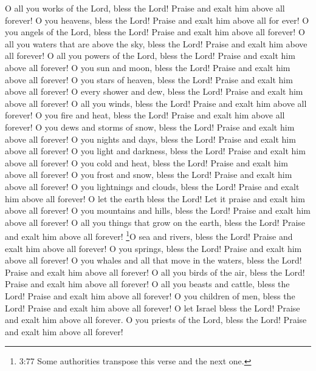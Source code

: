  O all you works of the Lord, bless the Lord! Praise and
exalt him above all forever!  O you heavens, bless the
Lord! Praise and exalt him above all for ever!  O you
angels of the Lord, bless the Lord! Praise and exalt him above all
forever!  O all you waters that are above the sky, bless
the Lord! Praise and exalt him above all forever!  O all
you powers of the Lord, bless the Lord! Praise and exalt him above all
forever!  O you sun and moon, bless the Lord! Praise and
exalt him above all forever!  O you stars of heaven, bless
the Lord! Praise and exalt him above all forever!  O every
shower and dew, bless the Lord! Praise and exalt him above all forever!
 O all you winds, bless the Lord! Praise and exalt him
above all forever!  O you fire and heat, bless the Lord!
Praise and exalt him above all forever!  O you dews and
storms of snow, bless the Lord! Praise and exalt him above all forever!
 O you nights and days, bless the Lord! Praise and exalt
him above all forever!  O you light and darkness, bless the
Lord! Praise and exalt him above all forever!  O you cold
and heat, bless the Lord! Praise and exalt him above all forever!
 O you frost and snow, bless the Lord! Praise and exalt him
above all forever!  O you lightnings and clouds, bless the
Lord! Praise and exalt him above all forever!  O let the
earth bless the Lord! Let it praise and exalt him above all forever!
 O you mountains and hills, bless the Lord! Praise and
exalt him above all forever!  O all you things that grow on
the earth, bless the Lord! Praise and exalt him above all forever!
 \footnote{3:77 Some authorities transpose this verse and
  the next one.}O sea and rivers, bless the Lord! Praise and exalt him
above all forever!  O you springs, bless the Lord! Praise
and exalt him above all forever!  O you whales and all that
move in the waters, bless the Lord! Praise and exalt him above all
forever!  O all you birds of the air, bless the Lord!
Praise and exalt him above all forever!  O all you beasts
and cattle, bless the Lord! Praise and exalt him above all forever!
 O you children of men, bless the Lord! Praise and exalt
him above all forever!  O let Israel bless the Lord! Praise
and exalt him above all forever.  O you priests of the
Lord, bless the Lord! Praise and exalt him above all forever!
